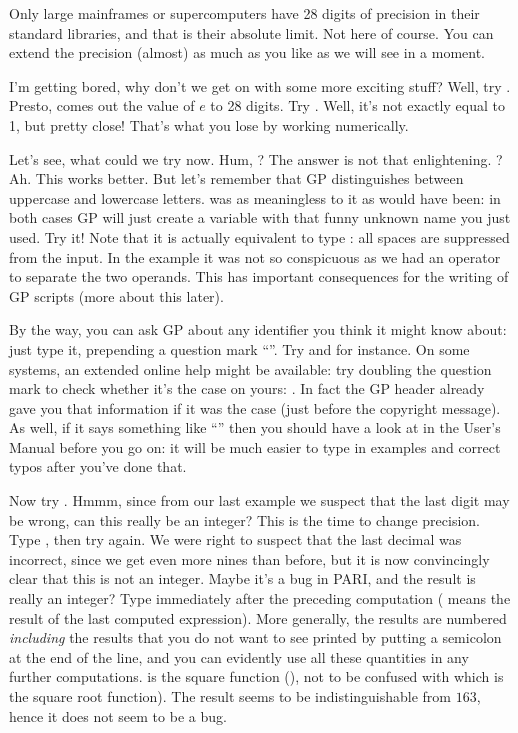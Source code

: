 Only large mainframes or supercomputers have 28 digits of precision in their
standard libraries, and that is their absolute limit. Not here of course. You
can extend the precision (almost) as much as you like as we will see in a
moment.

I'm getting bored, why don't we get on with some more exciting stuff?  Well,
try . Presto, comes out the value of $e$ to 28 digits. Try
. Well, it's not exactly equal to 1, but pretty close!  That's
what you lose by working numerically.

Let's see, what could we try now. Hum, ? The answer is not that
enlightening. ? Ah. This works better. But let's remember that GP
distinguishes between uppercase and lowercase letters.  was as
meaningless to it as  would have been: in both cases GP
will just create a variable with that funny unknown name you just used. Try
it! Note that it is actually equivalent to type : all
spaces are suppressed from the input. In the  example  it was
not so conspicuous as we had an operator to separate the two operands. This
has important consequences for the writing of GP scripts (more about this
later).

By the way, you can ask GP about any identifier you think it might know
about: just type it, prepending a question mark ``''. Try 
and  for instance. On some systems, an extended online help might
be available: try doubling the question mark to check whether it's the case on
yours: . In fact the GP header already gave you that information if
it was the case (just before the copyright message). As well, if it says
something like ``'' then you should have a look at
 in the User's Manual before you go on: it will be much
easier to type in examples and correct typos after you've done that.

Now try . Hmmm, since from our last example we
suspect that the last digit may be wrong, can this really be an integer?
This is the time to change precision. Type , then try
 again. We were right to suspect that the last
decimal was incorrect, since we get even more nines than before, but it is
now convincingly clear that this is not an integer. Maybe it's a bug in PARI,
and the result is really an integer? Type  immediately
after the preceding computation (\kbd{\%} means the result of the last
computed expression). More generally, the results are numbered
 {\it including} the results that you do not want to see
printed by putting a semicolon at the end of the line, and you can evidently
use all these quantities in any further computations.  is the square
function (), not to be confused with  which is
the square root function). The result seems to be indistinguishable from $163$,
hence it does not seem to be a bug.

